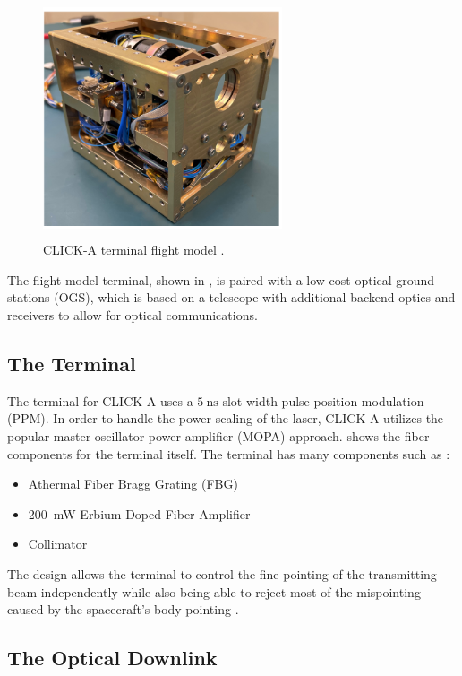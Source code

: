 \begin{figure}[H]
    \centering
    \includegraphics[width=200pt, height=200pt]{images/click_a_flight_model.PNG}
    \caption{CLICK-A terminal flight model \cite{click_a}.}
    \label{fig:flight_model_a}
\end{figure}

The flight model terminal, shown in , is paired with a low-cost optical ground stations (OGS), which is based on a telescope with additional backend optics and receivers to allow for optical communications.

\subsection{The Terminal}

The terminal for CLICK-A uses a \(\qty{5}{\nano\second}\) slot width pulse position modulation (PPM). In order to handle the power scaling of the laser, CLICK-A utilizes the popular master oscillator power amplifier (MOPA) approach.  shows the fiber components for the terminal itself. The terminal has many components such as \cite{click_a}:
\begin{itemize}
    \item Athermal Fiber Bragg Grating (FBG)
    \item \qty{200}{\milli\watt} Erbium Doped Fiber Amplifier
    \item Collimator
\end{itemize}

The design allows the terminal to control the fine pointing of the transmitting beam independently while also being able to reject most of the mispointing caused by the spacecraft's body pointing \cite{click_a}.

\subsection{The Optical Downlink}


